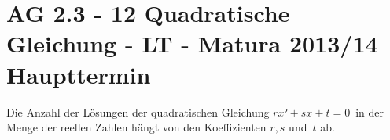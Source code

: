 \section{AG 2.3 - 12 Quadratische Gleichung - LT - Matura 2013/14 Haupttermin}

\begin{beispiel}[AG 2.3]{1} %
				Die Anzahl der Lösungen der quadratischen Gleichung $rx²+sx+t=0$ in der Menge der reellen Zahlen hängt von den Koeffizienten $r,s$ und $t$ ab.
				

\end{beispiel}
